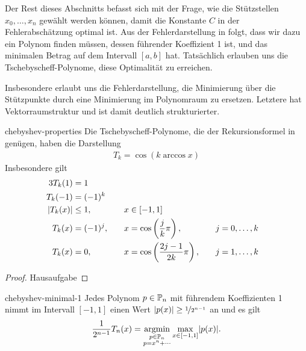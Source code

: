 \begin{intro}
  Der Rest dieses Abschnitts befasst sich mit der Frage, wie die
  Stützstellen $x_0,\dots,x_n$ gewählt werden können, damit die
  Konstante $C$ in der Fehlerabschätzung optimal ist.  Aus der
  Fehlerdarstellung in  folgt, dass
  wir dazu ein Polynom finden müssen, dessen führender Koeffizient 1
  ist, und das minimalen Betrag auf dem Intervall $[a,b]$ hat.
  Tatsächlich erlauben uns die Tschebyscheff-Polynome, diese
  Optimalität zu erreichen.

  Insbesondere erlaubt uns die Fehlerdarstellung, die Minimierung über
  die Stützpunkte durch eine Minimierung im Polynomraum zu
  ersetzen. Letztere hat Vektorraumstruktur und ist damit deutlich
  strukturierter.
\end{intro}

\begin{Lemma}{chebyshev-properties}
  Die Tschebyscheff-Polynome, die der Rekursionsformel in
   genügen, haben die
  Darstellung
  \begin{gather}
    T_k = \cos(k \operatorname{arccos} x)
  \end{gather}
  Insbesondere gilt
  \begin{alignat}3
    T_k(1)&=1\\
    T_k(-1) &= (-1)^k\\
    \abs{T_k(x)} &\le 1, &\quad x&\in [-1,1]\\
    T_k(x) &=(-1)^j,
                   &\quad x&=\cos\left(\frac{j}{k}\pi\right),
                   &\quad j&=0,\dots,k\\
    T_k(x) &= 0,
             &\quad x&=\cos\left(\frac{2j-1}{2k}\pi\right),
             &\quad j&=1,\dots,k
  \end{alignat}
\end{Lemma}

\begin{proof}
  Hausaufgabe
\end{proof}

\begin{Satz}{chebyshev-minimal-1}
  Jedes Polynom $p\in \P_n$ mit führendem Koeffizienten 1 nimmt im
  Intervall $[-1,1]$ einen Wert $\abs{p(x)} \ge \nicefrac1{2^{n-1}}$
  an und es gilt
  \begin{gather}
   \frac1{2^{n-1}} T_n(x)
   = \operatorname*{arg min}_{\substack{p\in\P_n\\p = x^n+\cdots}}
   \max_{x\in[-1,1]}\abs{p(x)}.
  \end{gather}
\end{Satz}

